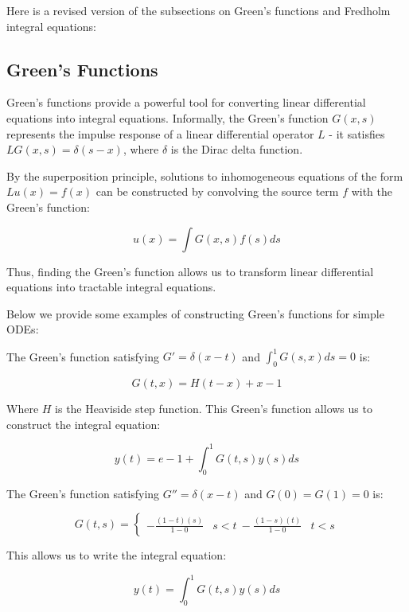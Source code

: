 Here is a revised version of the subsections on Green's functions and Fredholm integral equations:

\subsection{Green's Functions}

Green's functions provide a powerful tool for converting linear differential equations into integral equations. Informally, the Green's function $G(x,s)$ represents the impulse response of a linear differential operator $L$ - it satisfies $LG(x,s) = \delta(s-x)$, where $\delta$ is the Dirac delta function.

By the superposition principle, solutions to inhomogeneous equations of the form $Lu(x) = f(x)$ can be constructed by convolving the source term $f$ with the Green's function:

\begin{equation}
    u(x) = \int G(x,s) f(s) ds
\end{equation}

Thus, finding the Green's function allows us to transform linear differential equations into tractable integral equations.

Below we provide some examples of constructing Green's functions for simple ODEs:

\begin{example}[$y' = y$ with average condition]
    The Green's function satisfying $G' = \delta(x-t)$ and $\int_0^1 G(s,x)ds = 0$ is:

    \begin{equation}
        G(t,x) = H(t-x) + x - 1
    \end{equation}

    Where $H$ is the Heaviside step function. This Green's function allows us to construct the integral equation:

    \begin{equation}
        y(t) = e - 1 + \int_0^1 G(t,s) y(s) ds
    \end{equation}

\end{example}

\begin{example}[$y''=y$ with Dirichlet conditions]
    The Green's function satisfying $G'' = \delta(x-t)$ and $G(0) = G(1) = 0$ is:

    \begin{equation}
        G(t,s) = \begin{cases}
            -\frac{(1-t)(s)}{1-0} & s < t \
            -\frac{(1-s)(t)}{1-0} & t < s
        \end{cases}
    \end{equation}

    This allows us to write the integral equation:

    \begin{equation}
        y(t) = \int_0^1 G(t,s) y(s) ds
    \end{equation}

\end{example}

